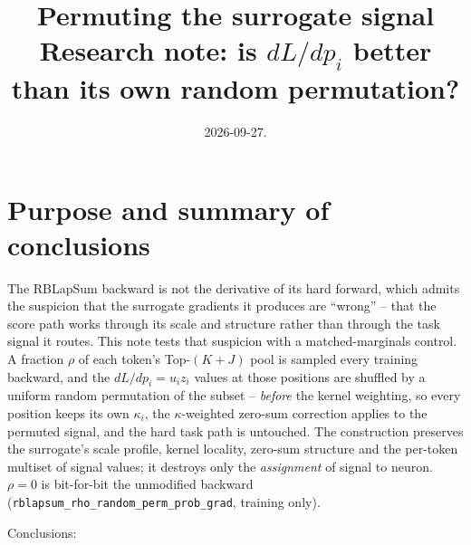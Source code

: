 \documentclass[11pt,a4paper]{article}
\title{Permuting the surrogate signal\\[2pt]
\large Research note: is $dL/dp_i$ better than its own random permutation?}
\author{}
\date{2026-09-27.}
\newcommand{\code}[1]{\texttt{#1}}
\begin{document}
\maketitle
\vspace{-2em}

\section{Purpose and summary of conclusions}

The RBLapSum backward is not the derivative of its hard forward, which admits
the suspicion that the surrogate gradients it produces are ``wrong'' -- that
the score path works through its scale and structure rather than through the
task signal it routes. This note tests that suspicion with a matched-marginals
control. A fraction $\rho$ of each token's Top-$(K{+}J)$ pool is sampled every
training backward, and the $dL/dp_i = u_i z_i$ values at those positions are
shuffled by a uniform random permutation of the subset -- \emph{before} the
kernel weighting, so every position keeps its own $\kappa_i$, the
$\kappa$-weighted zero-sum correction applies to the permuted signal, and the
hard task path is untouched. The construction preserves the surrogate's scale
profile, kernel locality, zero-sum structure and the per-token multiset of
signal values; it destroys only the \emph{assignment} of signal to neuron.
$\rho = 0$ is bit-for-bit the unmodified backward
(\code{rblapsum\_rho\_random\_perm\_prob\_grad}, training only).

Conclusions:
\end{document}
